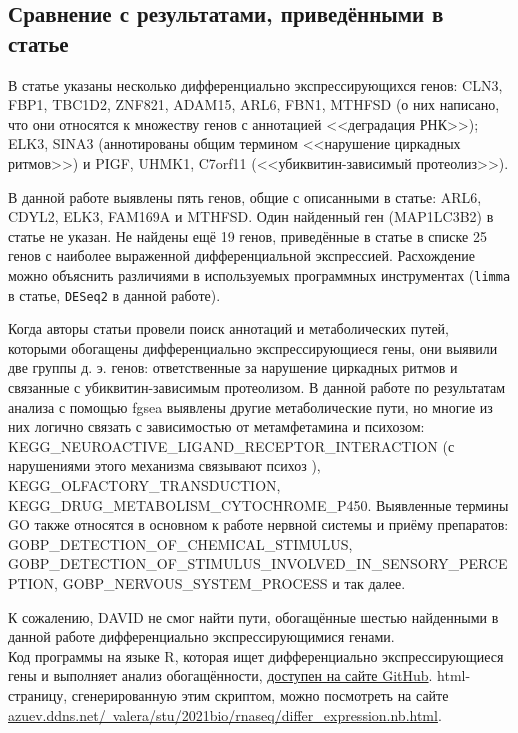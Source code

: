 \documentclass[a4paper,12pt]{article}
\begin{document}
\subsection{Сравнение с результатами, приведёнными в статье}

В статье \cite{breen} указаны несколько дифференциально экспрессирующихся генов: CLN3, FBP1, TBC1D2, ZNF821, ADAM15, ARL6, FBN1, MTHFSD (о них написано, что они относятся к множеству генов с аннотацией <<деградация РНК>>); ELK3, SINA3 (аннотированы общим термином <<нарушение циркадных ритмов>>) и PIGF, UHMK1, C7orf11 (<<убиквитин-зависимый протеолиз>>).

В данной работе выявлены пять генов, общие с описанными в статье: ARL6, CDYL2, ELK3, FAM169A и MTHFSD.
Один найденный ген (MAP1LC3B2) в статье не указан.
Не найдены ещё 19 генов, приведённые в статье в списке 25 генов с наиболее выраженной дифференциальной экспрессией.
Расхождение можно объяснить различиями в используемых программных инструментах (\texttt{limma} в статье, \texttt{DESeq2} в данной работе).

Когда авторы статьи провели поиск аннотаций и метаболических путей, которыми обогащены дифференциально экспрессирующиеся гены, они выявили две группы д. э. генов: ответственные за нарушение циркадных ритмов и связанные с убиквитин-зависимым протеолизом.
В данной работе по результатам анализа с помощью fgsea выявлены другие метаболические пути, но многие из них логично связать с зависимостью от метамфетамина и психозом: KEGG\_\-NEUROACTIVE\_\-LIGAND\_\-RECEPTOR\_\-INTERACTION (с нарушениями этого механизма связывают психоз \cite{adkins2011}), KEGG\_\-OLFACTORY\_\-\-TRANSDUCTION, KEGG\_\-DRUG\_\-METABOLISM\_\-CYTOCHROME\_\-P450.
Выявленные термины GO также относятся в основном к работе нервной системы и приёму препаратов: GOBP\_\-DETECTION\_\-OF\_\-CHEMICAL\_\-STIMULUS, GOBP\_\-DETECTION\_\-OF\_\-STIMULUS\_\-INVOLVED\_\-IN\_\-SENSORY\_\-PERCEPTION, GOBP\_\-NERVOUS\_\-SYSTEM\_\-PROCESS и так далее.

К сожалению, DAVID не смог найти пути, обогащённые шестью найденными в данной работе дифференциально экспрессирующимися генами. \\

Код программы на языке R, которая ищет дифференциально экспрессирующиеся гены и выполняет анализ обогащённости, \href{https://github.com/zuevval/source/tree/master/r/bioinf2021/lab2rna_seq}{доступен на сайте GitHub}.
html-страницу, сгенерированную этим скриптом, можно посмотреть на сайте \href{http://azuev.ddns.net/~valera/stu/2021bio/rnaseq/differ_expression.nb.html}{azuev.ddns.net/\string~valera/stu/2021bio/rnaseq/differ\_expression.nb.html}.
\end{document}
